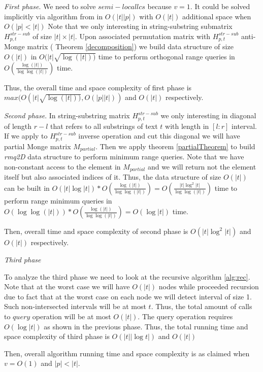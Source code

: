 \emph{First phase}. 
We need to solve $semi-local lcs$ because $v=1$.
It could be solved implicitly via algorithm from \cite{.}
in $O(|t||p|)$ with $O(|t|)$ additional space when $O(|p|<|t|)$
Note that we only interesting in string-substring submatrix $H^{str-sub}_{p,t}$ of size $|t| \times |t|$.
Upon associated permutation matrix with $H^{str-sub}_{p,t}$ anti-Monge matrix ( Theorem \ref{decomposition})  we build data structure
of size $O(|t|)$ in $O(|t|\sqrt{\log(|t|))}$ time to 
perform  orthogonal range queries in $O(\frac{\log (|t|)}{\log \log (|t|)})$ time.

Thus, the overall time and space complexity of first phase 
is $max(O(|t|  \sqrt{\log(|t|))},O(|p||t|))$ and
$O(|t|)$ respectively.

\emph{Second phase}.
In string-substring matrix $H^{str-sub}_{p,t}$ we only interesting in diagonal of length $r-l$ that refers to all substrings of text $t$ with length in $[l:r]$ interval. 
If we apply to  $H^{str-sub}_{p,t}$ inverse operation and cut this diagonal we will have partial Monge matrix $M_{partial}$.
Then we apply theorem  \ref{partialTheorem} to build 
\emph{rmq2D} data structure to perform minimum range queries.
Note that we have non-constant access to the element in $M_{partial}$ and we will return not the element itself but also associated indices of it.
Thus, the data structure of size 
$O(|t|)$
 can be built in $O(|t| \log |t|)* O(\frac{\log (|t|)}{\log \log (|t|)}) = O(\frac{|t|\log^2 |t|}{\log \log (|t|)}) $ time
to perform range minimum queries in $O(\log \log (|t|))*O(\frac{\log (|t|)}{\log \log (|t|)})=O(\log |t|)$ time.

Then, overall time and space complexity of second phase is 
$O(|t| \log^2 |t|)$ and
$O(|t|)$
respectively.


\emph{Third phase}

To analyze the third phase we need to look at the recursive algorithm \ref{alg:rec}.
Note that at the worst case we will have $O(|t|)$ nodes while proceeded recursion due to fact that at the worst case on each node we will detect interval of size 1.
Such non-intersected intervals will be at most $t$.
Thus, the total amount of calls to $query$ operation will be at most 
$O(|t|)$.
The query operation requires $O(\log |t|)$ as shown in the previous phase.
Thus, the total running time and space complexity of third phase is 
$O(|t| |\log t|)$ and $O(|t|)$  

Then, overall algorithm running time and space complexity is as claimed when $v=O(1)$ and $|p|<|t|$.




